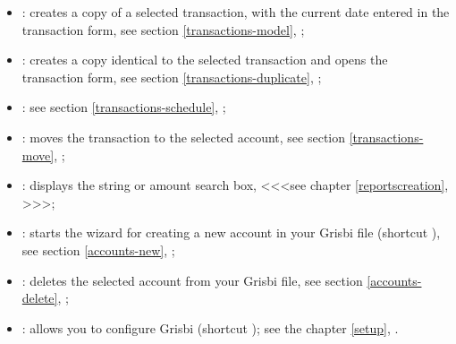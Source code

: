 \begin{itemize}
	\item {}: creates a copy of a selected transaction, with the current date entered in the transaction form, see section \vref{transactions-model}, ;
	\item {}: creates a copy identical to the selected transaction and opens the transaction form, see section \vref{transactions-duplicate}, ;
	\item {}: see section \vref{transactions-schedule}, ;
	\item {}: moves the transaction to the selected account, see section \vref{transactions-move}, ;
	\item {}: displays the string or amount search box, <<<see chapter \vref{reportscreation}, >>>;%
	\item {}: starts the wizard for creating a new account in your Grisbi file (shortcut ), see section \vref{accounts-new}, ;
	\item {}: deletes the selected account from your Grisbi file, see section \vref{accounts-delete}, ;
	\item {}: allows you to configure Grisbi (shortcut ); see the chapter \vref{setup}, .
\end{itemize}


